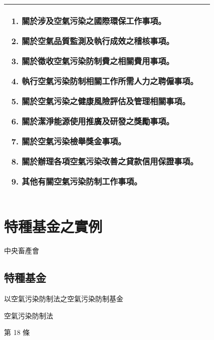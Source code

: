 \documentclass[12pt,a4paper]{article}
\begin{document}
\begin{table}[htbp]
\begin{tabular}{|p{7.5cm}|p{7.5cm}|}
\begin{enumerate}[label=\zhnum*、,topsep=0.5em, partopsep=0pt, itemsep=0pt, parsep=0pt,leftmargin=3em]
  \item  關於涉及空氣污染之國際環保工作事項。
  \item  關於空氣品質監測及執行成效之稽核事項。
  \item  關於徵收空氣污染防制費之相關費用事項。
  \item  執行空氣污染防制相關工作所需人力之聘僱事項。
  \item  關於空氣污染之健康風險評估及管理相關事項。
  \item  \textbf{關於潔淨能源使用推廣及研發之獎勵事項。}
  \item  關於空氣污染檢舉獎金事項。
  \item  關於辦理各項空氣污染改善之貸款信用保證事項。
  \item  其他有關空氣污染防制工作事項。
  \end{enumerate} \\
  \hline
  \end{tabular}
  \end{table}


\pagebreak


\section{特種基金之實例}


中央畜產會

\subsection{特種基金}

以空氣污染防制法之空氣污染防制基金


空氣污染防制法


第 18 條\textcite{KeGeZhong2008}





\end{document}
